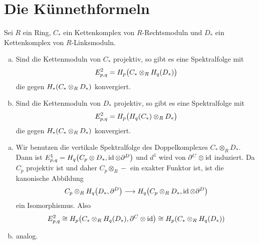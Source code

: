 \section{Die Künnethformeln} %
\label{sec:16}
\begin{proposition}
	Sei $R$ ein Ring, $C_*$ ein Kettenkomplex von $R$-Rechtsmoduln und $D_*$ ein Kettenkomplex von $R$-Linksmoduln.
	\begin{enumerate}[a)]
		\item Sind die Kettenmoduln von $C_*$ projektiv, so gibt es eine Spektralfolge mit 
		\[
			E^2_{p,q} = H_p \enbrace[\big]{C_* \otimes_R H_q(D_*)} 
		\]
		die gegen $H_* \enbrace*{C_* \otimes_R D_{*}}$ konvergiert.
		\item Sind die Kettenmoduln von $D_*$ projektiv, so gibt es eine Spektralfolge mit 
		\[
			E^2_{p,q} = H_p \enbrace[\big]{H_q(C_*) \otimes_R D_*} 
		\]
		die gegen $H_* \enbrace*{C_* \otimes_R D_*}$ konvergiert.
	\end{enumerate}
\end{proposition}
\begin{beweis}
	\leavevmode
	\begin{enumerate}[a)]
		\item Wir benutzen die vertikale Spektralfolge des Doppelkomplexes $C_* \otimes_R D_*$.
		Dann ist $E^1_{p,q}= H_q \enbrace*{C_p \otimes D_*, \id \otimes \partial^D}$ und $d^1$ wird von $\partial^C \otimes \id$ induziert.
		Da $C_p$ projektiv ist und daher $C_p \otimes_R -$ ein exakter Funktor ist, ist die kanonische Abbildung 
		\[
			C_p \otimes_R H_q \enbrace*{D_*,\partial^D} \longrightarrow H_q \enbrace*{C_p \otimes_R D_*, \id \otimes \partial^D} 
		\]
		ein Isomorphismus. Also 
		\[
			E^2_{p,q} \cong H_p \enbrace*{C_* \otimes_R H_q(D_*), \partial^C \otimes \id} \cong H_p \enbrace*{C_* \otimes_R H_q(D_*)}
		\]
		\item analog. \qedhere
	\end{enumerate}
\end{beweis}

